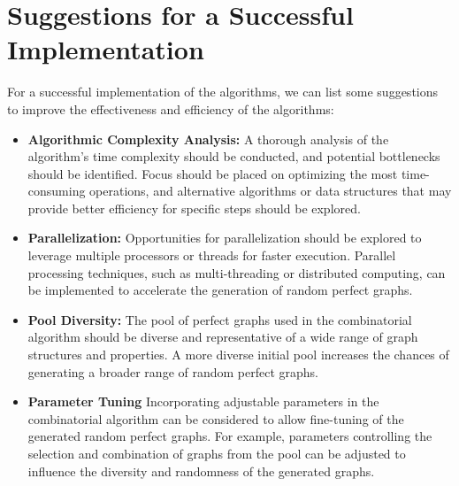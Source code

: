 \section{Suggestions for a Successful Implementation}

For a successful implementation of the algorithms, we can list some suggestions to improve the effectiveness and efficiency of the algorithms:

\begin{itemize}

\item \textbf{Algorithmic Complexity Analysis:} A thorough analysis of the algorithm's time complexity should be conducted, and potential bottlenecks should be identified. Focus should be placed on optimizing the most time-consuming operations, and alternative algorithms or data structures that may provide better efficiency for specific steps should be explored.

\item \textbf{Parallelization:} Opportunities for parallelization should be explored to leverage multiple processors or threads for faster execution. Parallel processing techniques, such as multi-threading or distributed computing, can be implemented to accelerate the generation of random perfect graphs.

\item \textbf{Pool Diversity:} The pool of perfect graphs used in the combinatorial algorithm should be diverse and representative of a wide range of graph structures and properties. A more diverse initial pool increases the chances of generating a broader range of random perfect graphs.

\item \textbf{Parameter Tuning} Incorporating adjustable parameters in the combinatorial algorithm can be considered to allow fine-tuning of the generated random perfect graphs. For example, parameters controlling the selection and combination of graphs from the pool can be adjusted to influence the diversity and randomness of the generated graphs.
\end{itemize}